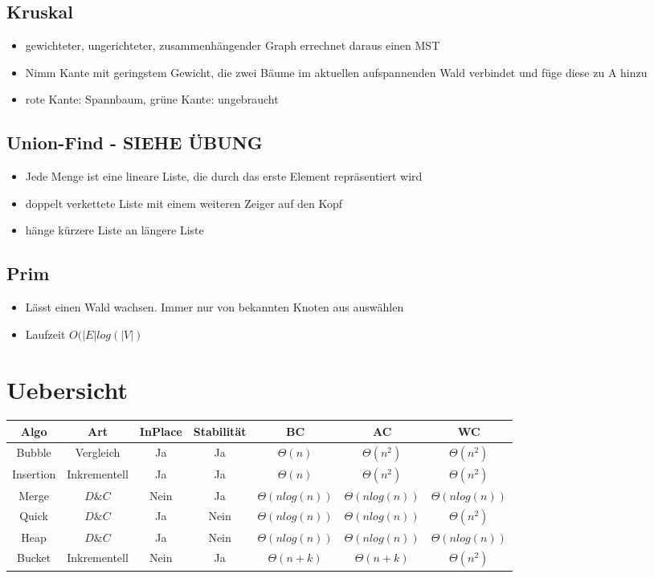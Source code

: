 \documentclass{article}
\begin{document}
\subsection{Kruskal}
\begin{itemize}
\item gewichteter, ungerichteter, zusammenh{\"a}ngender Graph errechnet daraus einen MST
\item Nimm Kante mit geringstem Gewicht, die zwei B{\"a}ume im aktuellen aufspannenden Wald verbindet und f{\"u}ge diese zu A hinzu
\item rote Kante: Spannbaum, gr{\"u}ne Kante: ungebraucht
\end{itemize}

\subsection{Union-Find - SIEHE {\"U}BUNG}
\begin{itemize}
\item Jede Menge ist eine lineare Liste, die durch das erste Element repr{\"a}sentiert wird
\item doppelt verkettete Liste mit einem weiteren Zeiger auf den Kopf
\item h{\"a}nge k{\"u}rzere Liste an l{\"a}ngere Liste
\end{itemize}

\subsection{Prim}
\begin{itemize}
\item L{\"a}sst einen Wald wachsen. Immer nur von bekannten Knoten aus ausw{\"a}hlen
\item  Laufzeit $O(|E| log(|V|)$
\end{itemize}

\section{Uebersicht}
\begin{tabular}{c | c| c| c| c |c| c }
Algo & Art & InPlace & Stabilit{\"a}t & BC & AC & WC \\ \hline
Bubble& Vergleich& Ja & Ja & $\Theta(n)$ & $\Theta(n^2)$ & $\Theta(n^2)$\\
Insertion& Inkrementell & Ja & Ja & $\Theta(n)$ & $\Theta(n^2)$ & $\Theta(n^2)$ \\
Merge& $D\&C $ & Nein & Ja & $\Theta(nlog(n))$ & $\Theta(nlog(n))$ & $\Theta(nlog(n))$ \\
Quick& $D\&C $ & Ja & Nein & $\Theta(nlog(n))$ & $\Theta(nlog(n))$ & $\Theta(n^2)$ \\
Heap& $D\&C $ & Ja & Nein & $\Theta(nlog(n))$ & $\Theta(nlog(n))$ & $\Theta(nlog(n))$ \\
Bucket& Inkrementell & Nein & Ja & $\Theta(n+k)$ & $\Theta(n+k)$ & $\Theta(n^2)$ \\

\end{tabular}
\end{document}
